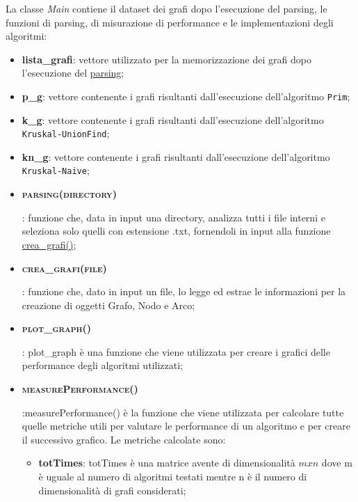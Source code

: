 La classe \textit{Main} contiene il dataset dei grafi dopo l'esecuzione del parsing, le funzioni di parsing, di misurazione di performance e le implementazioni degli algoritmi:

\begin{itemize}
    
    \item \textbf{lista\_grafi}: vettore utilizzato per la memorizzazione dei grafi dopo l'esecuzione del \hyperlink{parsing}{parsing};
    
    \item \textbf{p\_g}: vettore contenente i grafi risultanti dall'esecuzione dell'algoritmo \texttt{Prim};
    
    \item \textbf{k\_g}: vettore contenente i grafi risultanti dall'esecuzione dell'algoritmo \texttt{Kruskal-UnionFind};
    
    \item \textbf{kn\_g}: vettore contenente i grafi risultanti dall'esecuzione dell'algoritmo \texttt{Kruskal-Naive};
    
    
    \item \hypertarget{parsing}{\textbf{\textsc{parsing(directory)}}}: funzione che, data in input una directory, analizza tutti i file interni e seleziona solo quelli con estensione .txt, fornendoli in input alla funzione \hyperlink{creagrafi}{crea\_grafi()};
    
    \item \hypertarget{creagrafi}{\textbf{\textsc{crea\_grafi(file)}}}: funzione che, dato in input un file, lo legge ed estrae le informazioni per la creazione di oggetti Grafo, Nodo e Arco;
    
    \item \hypertarget{plotgrafi}{\textbf{\textsc{plot\_graph()}}}: plot\_graph è una funzione che viene utilizzata per creare i grafici delle performance degli algoritmi utilizzati;
    
    \item \hypertarget{measureperformance}{\textbf{\textsc{measurePerformance()}}}:measurePerformance() è la funzione che viene utilizzata per calcolare tutte quelle metriche utili per valutare le performance di un algoritmo e per creare il successivo grafico. Le metriche calcolate sono:
   
    \begin{itemize}
        
        \item  \textbf{totTimes}: totTimes è una matrice avente di dimensionalità $mxn$ dove m è uguale al numero di algoritmi testati mentre n è il numero di dimensionalità di grafi considerati;
        

\end{itemize}
\end{itemize}

